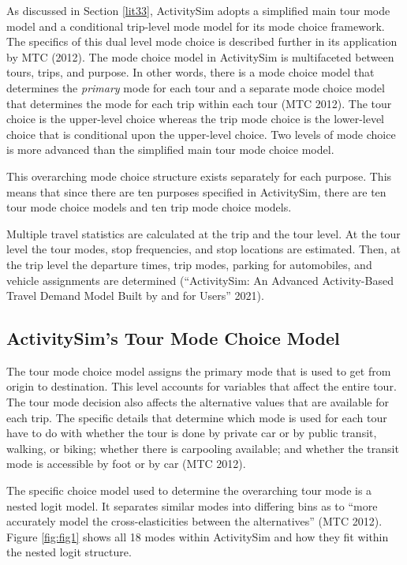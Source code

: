 \documentclass[12pt, oneside, openright]{byuthesis}
\begin{document}
As discussed in Section \ref{lit33}, ActivitySim adopts a simplified main tour mode model and a conditional trip-level mode model for its mode choice framework. The specifics of this dual level mode choice is described further in its application by MTC (2012).
The mode choice model in ActivitySim is multifaceted between tours, trips, and purpose. In other words, there is a mode choice model that determines the \emph{primary} mode for each tour and a separate mode choice model that determines the mode for each trip within each tour (MTC 2012). The tour choice is the upper-level choice whereas the trip mode choice is the lower-level choice that is conditional upon the upper-level choice. Two levels of mode choice is more advanced than the simplified main tour mode choice model.

This overarching mode choice structure exists separately for each purpose. This means that since there are ten purposes specified in ActivitySim, there are ten tour mode choice models and ten trip mode choice models.

Multiple travel statistics are calculated at the trip and the tour level. At the tour level the tour modes, stop frequencies, and stop locations are estimated. Then, at the trip level the departure times, trip modes, parking for automobiles, and vehicle assignments are determined ({``ActivitySim: An Advanced Activity-Based Travel Demand Model Built by and for Users''} 2021).

\hypertarget{lit41}{%
\subsection{ActivitySim's Tour Mode Choice Model}\label{lit41}}

The tour mode choice model assigns the primary mode that is used to get from origin to destination. This level accounts for variables that affect the entire tour. The tour mode decision also affects the alternative values that are available for each trip. The specific details that determine which mode is used for each tour have to do with whether the tour is done by private car or by public transit, walking, or biking; whether there is carpooling available; and whether the transit mode is accessible by foot or by car (MTC 2012).

The specific choice model used to determine the overarching tour mode is a nested logit model. It separates similar modes into differing bins as to ``more accurately model the cross-elasticities between the alternatives'' (MTC 2012). Figure \ref{fig:fig1} shows all 18 modes within ActivitySim and how they fit within the nested logit structure.
\end{document}
